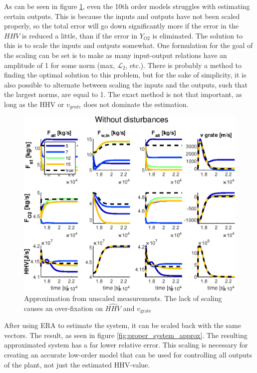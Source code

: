 \noindent
As can be seen in figure \ref{fig:unscaled_system_approx}, even the 10th order models struggles with estimating certain outputs. This is because the inputs and outputs have not been scaled properly, so the total error will go down significantly more if the error in the $HHV$ is reduced a little, than if the error in $Y_{O2}$ is eliminated. The solution to this is to scale the inputs and outputs somewhat. One formulation for the goal of the scaling can be set is to make as many input-output relations have an amplitude of 1 for some norm (max, $\mathcal{L}_2$, etc.). There is probably a method to finding the optimal solution to this problem, but for the sake of simplicity, it is also possible to alternate between scaling the inputs and the outputs, such that the largest norms, are equal to 1. The exact method is not that important, as long as the HHV or $v_{grate}$ does not dominate the estimation. 

\begin{figure}
    \centering
    \includegraphics[width=1\textwidth]{img/Fig_dump/Unscaled_ERA_step_approx_without_disturbance_inputs.eps}
    \caption{Approximation from unscaled measurements. The lack of scaling causes an over-fixation on $\hat{HHV}$ and $v_{\text{grate}}$}
    \label{fig:unscaled_system_approx}
\end{figure}



\noindent
After using ERA to estimate the system, it can be scaled back with the same vectors. The result, as seen in figure \ref{fig:proper_system_approx}. The resulting approximated system has a far lower relative error. This scaling is necessary for creating an accurate low-order model that can be used for controlling all outputs of the plant, not just the estimated HHV-value.

